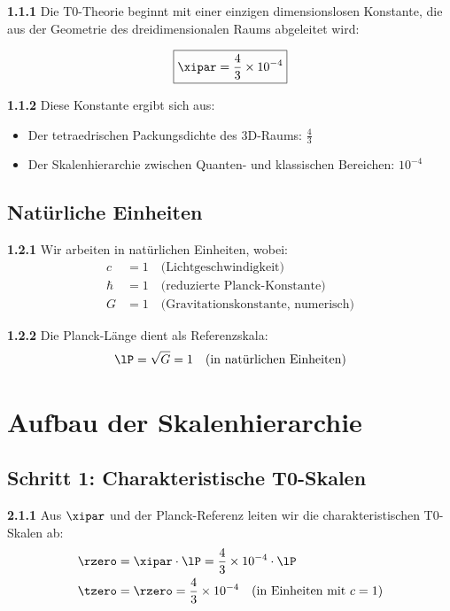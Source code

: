 	\noindent \textbf{1.1.1} Die T0-Theorie beginnt mit einer einzigen dimensionslosen Konstante, die aus der Geometrie des dreidimensionalen Raums abgeleitet wird:
	
	\begin{keyresult}
		\begin{equation}
			\boxed{\xipar = \frac{4}{3} \times 10^{-4}}
		\end{equation}
	\end{keyresult}
	
	\noindent \textbf{1.1.2} Diese Konstante ergibt sich aus:
	\begin{itemize}
		\item Der tetraedrischen Packungsdichte des 3D-Raums: $\frac{4}{3}$
		\item Der Skalenhierarchie zwischen Quanten- und klassischen Bereichen: $10^{-4}$
	\end{itemize}
	
	\subsection{Natürliche Einheiten}
	
	\noindent \textbf{1.2.1} Wir arbeiten in natürlichen Einheiten, wobei:
	\begin{align}
		c &= 1 \quad \text{(Lichtgeschwindigkeit)} \\
		\hbar &= 1 \quad \text{(reduzierte Planck-Konstante)} \\
		G &= 1 \quad \text{(Gravitationskonstante, numerisch)}
	\end{align}
	
	\noindent \textbf{1.2.2} Die Planck-Länge dient als Referenzskala:
	\begin{equation}
		\lP = \sqrt{G} = 1 \quad \text{(in natürlichen Einheiten)}
	\end{equation}
	
	\section{Aufbau der Skalenhierarchie}
	
	\subsection{Schritt 1: Charakteristische T0-Skalen}
	
	\noindent \textbf{2.1.1} Aus $\xipar$ und der Planck-Referenz leiten wir die charakteristischen T0-Skalen ab:
	\begin{align}
		\rzero &= \xipar \cdot \lP = \frac{4}{3} \times 10^{-4} \cdot \lP \\
		\tzero &= \rzero = \frac{4}{3} \times 10^{-4} \quad \text{(in Einheiten mit } c=1\text{)}
	\end{align}
	
